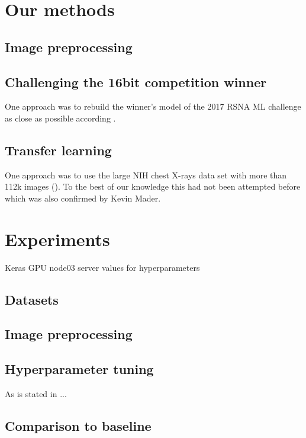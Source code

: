 \documentclass[10pt,twocolumn,letterpaper]{article}
\begin{document}
\section{Our methods}

\subsection{Image preprocessing}

\subsection{Challenging the 16bit competition winner}
One approach was to rebuild the winner's model of the 2017 RSNA ML challenge as close as possible according \cite{16bitrsnachallenge}.

\subsection{Transfer learning}
One approach was to use the large NIH chest X-rays data set with more than 112k images (\cite{nihchestxray}). 
To the best of our knowledge this had not been attempted before which was also confirmed by Kevin Mader.



\section{Experiments}
Keras
GPU node03 server
values for hyperparameters

\subsection{Datasets}

\subsection{Image preprocessing}

\subsection{Hyperparameter tuning}
As is stated in \cite{1802.09596} ...

\subsection{Comparison to baseline}
\end{document}
